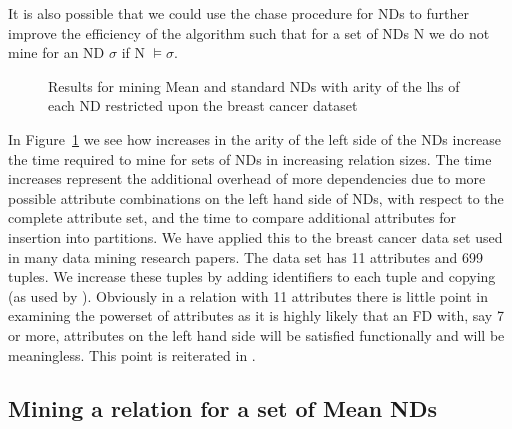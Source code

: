 \medskip

It is also possible that we could use the chase procedure for NDs to
further improve the efficiency of the algorithm such that for a set of NDs
N we do not mine for an ND $\sigma$ if N $\models \sigma$.

\begin{figure}
\centerline{}
\caption{\label{graph:nd_mine1}{Results for mining Mean and
standard NDs with arity of the lhs of each ND restricted upon the
breast cancer dataset}}
\end{figure}

In Figure~\ref{graph:nd_mine1} we see how increases in the arity of
the left side of the NDs increase the time required to mine for sets
of NDs in increasing relation sizes. The time increases represent the
additional overhead of more dependencies due to more possible
attribute combinations on the left hand side of NDs, with respect to
the complete attribute set, and the time to compare additional
attributes for insertion into partitions. We have applied this to the
breast cancer data set \cite{bkm98} used in many data mining research
papers. The data set has 11 attributes and 699 tuples. We increase
these tuples by adding identifiers to each tuple and copying (as used
by \cite{hkp98}). Obviously in a relation with 11 attributes 
there is little point in examining the powerset of attributes as it is
highly likely that an FD with, say 7 or more, attributes on the left hand
side will be satisfied functionally and will be meaningless. This
point is reiterated in \cite{sf93}. 

\subsection{Mining a relation for a set of Mean NDs}

